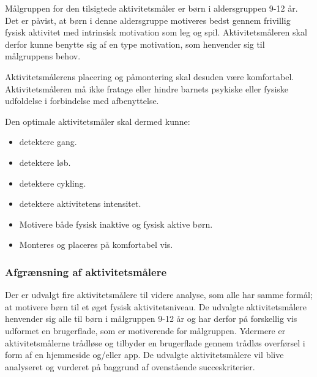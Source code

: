 Målgruppen for den tilsigtede aktivitetsmåler er børn i aldersgruppen 9-12 år. Det er påvist, at børn i denne aldersgruppe motiveres bedst gennem frivillig fysisk aktivitet med intrinsisk motivation som leg og spil. Aktivitetsmåleren skal derfor kunne benytte sig af en type motivation, som henvender sig til målgruppens behov.

Aktivitetsmålerens placering og påmontering skal desuden være komfortabel. Aktivitetsmåleren må ikke fratage eller hindre barnets psykiske eller fysiske udfoldelse i forbindelse med afbenyttelse. 

Den optimale aktivitetsmåler skal dermed kunne: 
\begin{itemize}
\item detektere gang.
\item detektere løb.
\item detektere cykling. %
\item detektere aktivitetens intensitet. %
\item Motivere både fysisk inaktive og fysisk aktive børn. %
\item Monteres og placeres på komfortabel vis.
\end{itemize}

\subsubsection{Afgrænsning af aktivitetsmålere}  %
Der er udvalgt fire aktivitetsmålere til videre analyse, som alle har samme formål; at motivere børn til et øget fysisk aktivitetsniveau. De udvalgte aktivitetsmålere henvender sig alle til børn i målgruppen 9-12 år og har derfor på forskellig vis udformet en brugerflade, som er motiverende for målgruppen. Ydermere er aktivitetsmålerne trådløse og tilbyder en brugerflade gennem trådløs overførsel i form af en hjemmeside og/eller app. \newline
De udvalgte aktivitetsmålere vil blive analyseret og vurderet på baggrund af ovenstående succeskriterier.

